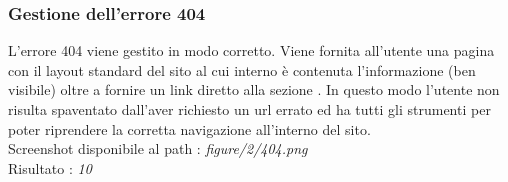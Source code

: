 \subsubsection{Gestione dell'errore 404}
L'errore 404 viene gestito in modo corretto.
Viene fornita all'utente una pagina con il layout standard del sito al cui
interno è contenuta l'informazione  (ben visibile) 
oltre a fornire un link diretto alla sezione 
. In questo modo l'utente non risulta
spaventato dall'aver richiesto un url errato ed ha tutti gli strumenti per poter
riprendere la corretta navigazione all'interno del sito. \\ 
Screenshot disponibile al path : \textit{figure/2/404.png} \\ 
Risultato : \textit{10}
